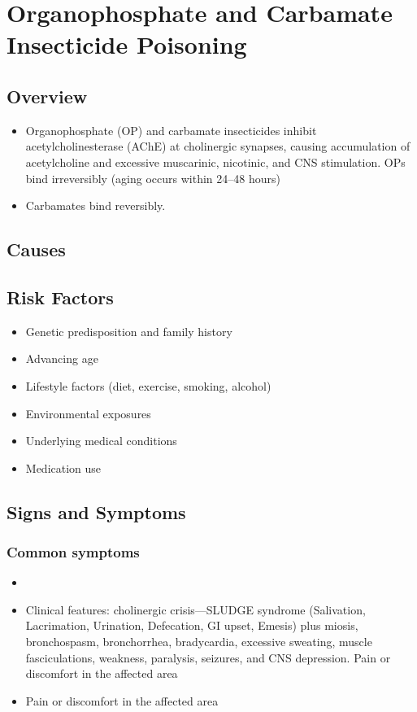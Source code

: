 \chapter{Organophosphate and Carbamate Insecticide Poisoning}
\label{sec:Organophosphate Poisoning}

\section{Overview}


\begin{itemize}[noitemsep]
  \item Organophosphate (OP) and carbamate insecticides inhibit acetylcholinesterase (AChE) at cholinergic synapses, causing accumulation of acetylcholine and excessive muscarinic, nicotinic, and CNS stimulation. OPs bind irreversibly (aging occurs within 24--48 hours)
  \item Carbamates bind reversibly.
\end{itemize}
\section{Causes}
\section{Risk Factors}

\begin{itemize}[noitemsep]
  \item Genetic predisposition and family history
  \item Advancing age
  \item Lifestyle factors (diet, exercise, smoking, alcohol)
  \item Environmental exposures
  \item Underlying medical conditions
  \item Medication use
\end{itemize}
\section{Signs and Symptoms}

\subsection{Common symptoms}
\begin{itemize}[noitemsep]
  \item \item Clinical features: cholinergic crisis---SLUDGE syndrome (Salivation, Lacrimation, Urination, Defecation, GI upset, Emesis) plus miosis, bronchospasm, bronchorrhea, bradycardia, excessive sweating, muscle fasciculations, weakness, paralysis, seizures, and CNS depression. Pain or discomfort in the affected area    \item Pain or discomfort in the affected area
  \end{itemize}

